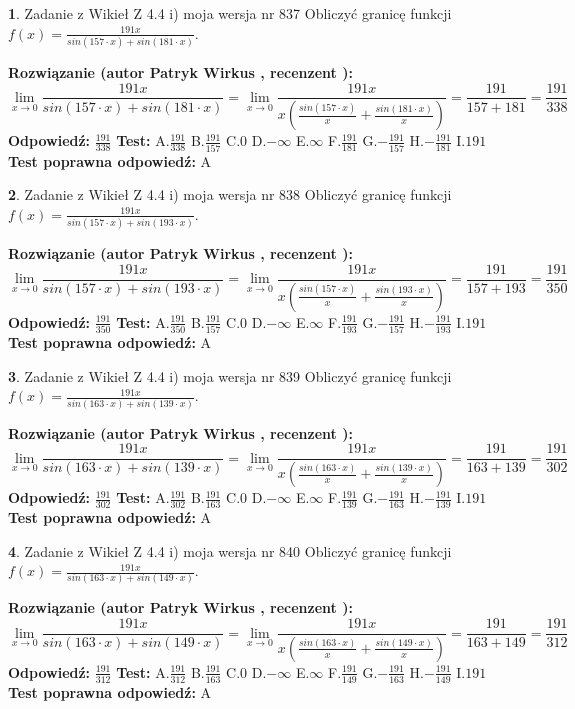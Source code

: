 \documentclass[12pt, a4paper]{article}
\theoremstyle{definition} %
\newtheorem{zad}{}
\newcommand{\zadStart}[1]{\begin{zad}#1\newline}
\newcommand{\zadStop}{\end{zad}}
\newcommand{\rozwStart}[2]{\noindent \textbf{Rozwiązanie (autor #1 , recenzent #2): }\newline}
\newcommand{\rozwStop}{\newline}
\newcommand{\odpStart}{\noindent \textbf{Odpowiedź:}\newline}
\newcommand{\odpStop}{\newline}
\newcommand{\testStart}{\noindent \textbf{Test:}\newline}
\newcommand{\testStop}{\newline}
\newcommand{\kluczStart}{\noindent \textbf{Test poprawna odpowiedź:}\newline}
\newcommand{\kluczStop}{\newline}
\begin{document}
\zadStart{Zadanie z Wikieł Z 4.4 i) moja wersja nr 837}
Obliczyć granicę funkcji $f(x)=\frac{191x}{sin(157\cdot x) +sin(181\cdot x)}$.
\zadStop
\rozwStart{Patryk Wirkus}{}
$$\lim\limits_{x\to 0}\frac{191x}{sin(157\cdot x) +sin(181\cdot x)}=\lim\limits_{x\to 0}\frac{191x}{x(\frac{sin(157\cdot x)}{x}+\frac{sin(181\cdot x)}{x})}=\frac{191}{157+181} = \frac{191}{338}$$
\rozwStop
\odpStart
$\frac{191}{338}$
\odpStop
\testStart
A.$\frac{191}{338}$
B.$\frac{191}{157}$
C.$0$
D.$-\infty$
E.$\infty$
F.$\frac{191}{181}$
G.$-\frac{191}{157}$
H.$-\frac{191}{181}$
I.$191$
\testStop
\kluczStart
A
\kluczStop



\zadStart{Zadanie z Wikieł Z 4.4 i) moja wersja nr 838}
Obliczyć granicę funkcji $f(x)=\frac{191x}{sin(157\cdot x) +sin(193\cdot x)}$.
\zadStop
\rozwStart{Patryk Wirkus}{}
$$\lim\limits_{x\to 0}\frac{191x}{sin(157\cdot x) +sin(193\cdot x)}=\lim\limits_{x\to 0}\frac{191x}{x(\frac{sin(157\cdot x)}{x}+\frac{sin(193\cdot x)}{x})}=\frac{191}{157+193} = \frac{191}{350}$$
\rozwStop
\odpStart
$\frac{191}{350}$
\odpStop
\testStart
A.$\frac{191}{350}$
B.$\frac{191}{157}$
C.$0$
D.$-\infty$
E.$\infty$
F.$\frac{191}{193}$
G.$-\frac{191}{157}$
H.$-\frac{191}{193}$
I.$191$
\testStop
\kluczStart
A
\kluczStop



\zadStart{Zadanie z Wikieł Z 4.4 i) moja wersja nr 839}
Obliczyć granicę funkcji $f(x)=\frac{191x}{sin(163\cdot x) +sin(139\cdot x)}$.
\zadStop
\rozwStart{Patryk Wirkus}{}
$$\lim\limits_{x\to 0}\frac{191x}{sin(163\cdot x) +sin(139\cdot x)}=\lim\limits_{x\to 0}\frac{191x}{x(\frac{sin(163\cdot x)}{x}+\frac{sin(139\cdot x)}{x})}=\frac{191}{163+139} = \frac{191}{302}$$
\rozwStop
\odpStart
$\frac{191}{302}$
\odpStop
\testStart
A.$\frac{191}{302}$
B.$\frac{191}{163}$
C.$0$
D.$-\infty$
E.$\infty$
F.$\frac{191}{139}$
G.$-\frac{191}{163}$
H.$-\frac{191}{139}$
I.$191$
\testStop
\kluczStart
A
\kluczStop



\zadStart{Zadanie z Wikieł Z 4.4 i) moja wersja nr 840}
Obliczyć granicę funkcji $f(x)=\frac{191x}{sin(163\cdot x) +sin(149\cdot x)}$.
\zadStop
\rozwStart{Patryk Wirkus}{}
$$\lim\limits_{x\to 0}\frac{191x}{sin(163\cdot x) +sin(149\cdot x)}=\lim\limits_{x\to 0}\frac{191x}{x(\frac{sin(163\cdot x)}{x}+\frac{sin(149\cdot x)}{x})}=\frac{191}{163+149} = \frac{191}{312}$$
\rozwStop
\odpStart
$\frac{191}{312}$
\odpStop
\testStart
A.$\frac{191}{312}$
B.$\frac{191}{163}$
C.$0$
D.$-\infty$
E.$\infty$
F.$\frac{191}{149}$
G.$-\frac{191}{163}$
H.$-\frac{191}{149}$
I.$191$
\testStop
\kluczStart
A
\kluczStop
\end{document}

